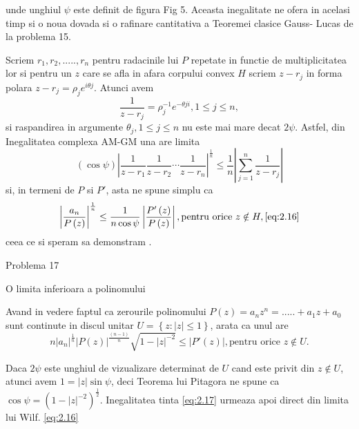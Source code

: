 \documentclass[a4paper,12pt,oneside]{report}
\begin{document}
unde unghiul \(\psi\) este definit de figura Fig 5. Aceasta inegalitate ne ofera in acelasi timp si o noua dovada si o rafinare cantitativa  a Teoremei clasice Gauss- Lucas de la problema 15. 

Scriem \(r_{1} , r_{2} ,.....,r_{n}\) pentru radacinile lui \(P\) repetate in functie de multiplicitatea lor si pentru un \(z\) care se afla in afara corpului convex \(H\) scriem \(z - r_{j}\) in forma polara \(z - r_{j} = \rho _{j}e^{i\theta j}\). Atunci avem 
\begin{displaymath}
  \frac{1}{z - r_{j}} = \rho _{j}^{-1}e^{-\theta ji} , 1 \leq  j \leq  n,
\end{displaymath}
si raspandirea in argumente \(\theta _{j}, 1 \leq j\leq n\) nu este mai mare decat \(2\psi\). Astfel, din Inegalitatea complexa AM-GM una are limita 
\begin{displaymath}
  \left ( \cos\psi  \right )\left | \frac{1}{z - r_{1}} \frac{1}{z - r_{2}}\cdots \frac{1}{z - r_{n}} \right|^{\frac{1}{n}} \leq  \frac{1}{n} \left | \sum_{j = 1}^{n}\frac{1}{z - r_{j}} \right |
\end{displaymath}
si, in termeni de \(P\) si \({P}'\), asta ne spune simplu ca 
\begin{displaymath}
   \left | \frac{a_{n}}{P\left ( z \right )} \right |^{\frac{1}{n}}\leq \frac{1}{n\cos\psi }\left | \frac{{P}'\left ( z \right )}{P\left ( z \right )} \right |,  \text{pentru orice }z \notin H, \ref{eq:2.16}
\end{displaymath}
 ceea ce si speram sa demonstram .

Problema 17

O limita inferioara a polinomului 

Avand in vedere faptul ca zerourile polinomului \(P\left ( z \right ) = a_{n}z^{n} =.....+a_{1}z + a_{0}\) sunt continute in discul unitar \(U= \left \{ z: \left | z \right |\leq 1 \right \}\), arata ca unul are
\begin{displaymath}
    n\left | a_{n} \right |^{\frac{1}{n}}\left | P\left ( z \right ) \right |^{\frac{\left ( n-1 \right )}{n}}\sqrt{1 - \left | z \right |^{-2}}\leq \left | {P}'\left ( z \right ) \right |, \text{pentru orice } z\notin U. \label{eq:2.17} \tag{2.17}
\end{displaymath}


Daca \(2\psi\) este unghiul de vizualizare determinat de \(U\) cand este privit din \(z \notin U\), atunci avem \(1 = \left | z \right |\sin\psi\), deci Teorema lui Pitagora ne spune ca \(\cos\psi = \left ( 1 - \left | z \right |^{-2} \right )^{\frac{1}{2}}\). Inegalitatea tinta \ref{eq:2.17} urmeaza apoi direct din limita lui Wilf. \ref{eq:2.16}
\end{document}
